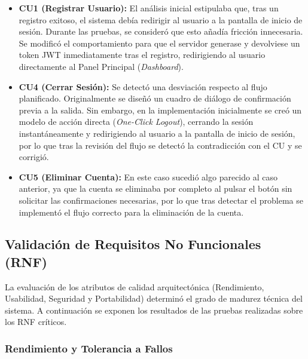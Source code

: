 \begin{itemize}
    \item \textbf{CU1 (Registrar Usuario):} El análisis inicial estipulaba que, tras un registro exitoso, el sistema debía redirigir al usuario a la pantalla de inicio de sesión. Durante las pruebas, se consideró que esto añadía fricción innecesaria. Se modificó el comportamiento para que el servidor generase y devolviese un token JWT inmediatamente tras el registro, redirigiendo al usuario directamente al Panel Principal (\textit{Dashboard}).

    \item \textbf{CU4 (Cerrar Sesión):} Se detectó una desviación respecto al flujo planificado. Originalmente se diseñó un cuadro de diálogo de confirmación previa a la salida. Sin embargo, en la implementación inicialmente se creó un modelo de acción directa (\textit{One-Click Logout}), cerrando la sesión instantáneamente y redirigiendo al usuario a la pantalla de inicio de sesión, por lo que tras la revisión del flujo se detectó la contradicción con el CU y se corrigió.

    \item \textbf{CU5 (Eliminar Cuenta):} En este caso sucedió algo parecido al caso anterior, ya que la cuenta se eliminaba por completo al pulsar el botón sin solicitar las confirmaciones necesarias, por lo que tras detectar el problema se implementó el flujo correcto para la eliminación de la cuenta.
\end{itemize}

\subsection{Validación de Requisitos No Funcionales (RNF)}

La evaluación de los atributos de calidad arquitectónica (Rendimiento, Usabilidad, Seguridad y Portabilidad) determinó el grado de madurez técnica del sistema. A continuación se exponen los resultados de las pruebas realizadas sobre los RNF críticos.

\subsubsection{Rendimiento y Tolerancia a Fallos}

